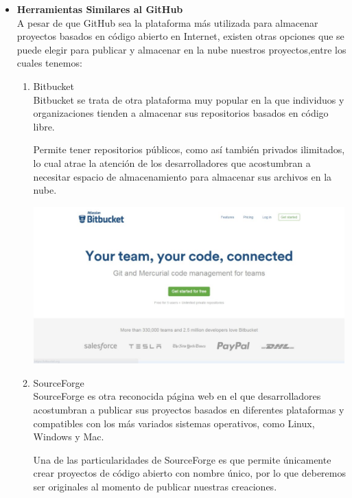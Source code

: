 \begin{itemize} %
\item \textbf{Herramientas Similares al GitHub}\\

A pesar de que GitHub sea la plataforma más utilizada para almacenar proyectos basados en código abierto en Internet, existen otras opciones que se puede elegir para publicar y almacenar en la nube nuestros proyectos,entre los cuales tenemos:

\begin{enumerate}[1.]

\item Bitbucket\\

Bitbucket se trata de otra plataforma muy popular en la que individuos y organizaciones tienden a almacenar sus repositorios basados en código libre. 

Permite tener repositorios públicos, como así también privados ilimitados, lo cual atrae la atención de los desarrolladores que acostumbran a necesitar espacio de almacenamiento para almacenar sus archivos en la nube.

\begin{center}
\includegraphics[width=12cm]{./Imagenes/actividad0303} 
\end{center}

\item SourceForge\\

SourceForge es otra reconocida página web en el que desarrolladores acostumbran a publicar sus proyectos basados en diferentes plataformas y compatibles con los más variados sistemas operativos, como Linux, Windows y Mac. 

Una de las particularidades de SourceForge es que permite únicamente crear proyectos de código abierto con nombre único, por lo que deberemos ser originales al momento de publicar nuestras creaciones. 


\end{enumerate}
\end{itemize}
